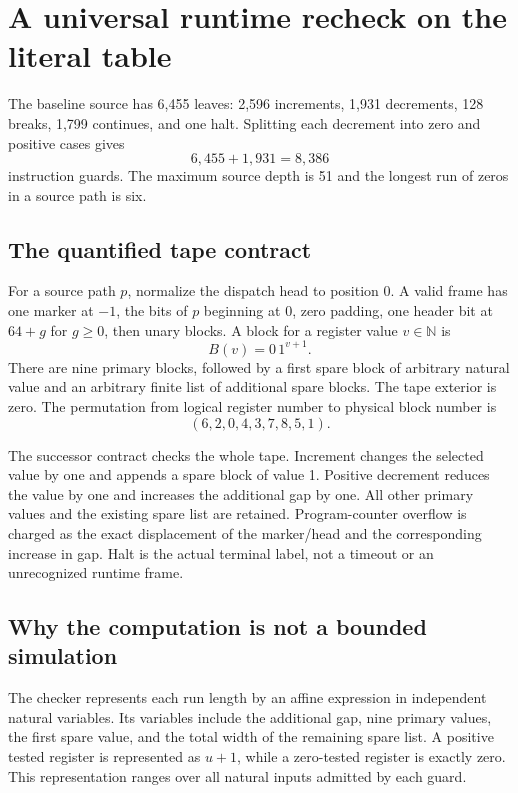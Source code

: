 \documentclass[11pt,a4paper]{article}
\theoremstyle{definition}
\begin{document}
\section{A universal runtime recheck on the literal table}
\label{sec:runtime}

The baseline source has 6,455 leaves: 2,596 increments, 1,931 decrements,
128 breaks, 1,799 continues, and one halt.  Splitting each decrement into
zero and positive cases gives
\[
 6,455+1,931=8,386
\]
instruction guards.  The maximum source depth is 51 and the longest run of
zeros in a source path is six.

\subsection{The quantified tape contract}

For a source path $p$, normalize the dispatch head to position 0.  A valid
frame has one marker at $-1$, the bits of $p$ beginning at 0, zero padding,
one header bit at $64+g$ for $g\geq0$, then unary blocks.  A block for a
register value $v\in\mathbb N$ is
\[
 B(v)=0\,1^{v+1}.
\]
There are nine primary blocks, followed by a first spare block of arbitrary
natural value and an arbitrary finite list of additional spare blocks.
The tape exterior is zero.  The permutation from logical register number
to physical block number is
\[
 (6,2,0,4,3,7,8,5,1).
\]

The successor contract checks the whole tape.  Increment changes the
selected value by one and appends a spare block of value 1.  Positive
decrement reduces the value by one and increases the additional gap by one.
All other primary values and the existing spare list are retained.
Program-counter overflow is charged as the exact displacement of the
marker/head and the corresponding increase in gap.  Halt is the actual
terminal label, not a timeout or an unrecognized runtime frame.

\subsection{Why the computation is not a bounded simulation}

The checker represents each run length by an affine expression in
independent natural variables.  Its variables include the additional gap,
nine primary values, the first spare value, and the total width of the
remaining spare list.  A positive tested register is represented as $u+1$,
while a zero-tested register is exactly zero.  This representation ranges
over all natural inputs admitted by each guard.
\end{document}
